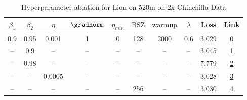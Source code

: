 \begin{table}[H]
\centering
\caption{Hyperparameter ablation for Lion on 520m on 2x Chinchilla Data}
\label{tab:ablation_lion_520m_on_2x_chinchilla_data}
\begin{tabular}{cccccccccc}
\toprule
$\beta_1$ & $\beta_2$ & $\eta$ & $\gradnorm$ & $\eta_{min}$ & $\mathrm{BSZ}$ & $\mathrm{warmup}$ & $\lambda$ & Loss & Link \\
\midrule
0.9 & 0.95 & 0.001 & 1 & 0 & 128 & 2000 & 0.6 & 3.029 & \href{https://wandb.ai/stanford-mercury/optimizer-scaling/runs/sweep-520m-21B-lion30535dlr0.001-wd0.6-minlr0-warmup2000-b10.9-b-c72b9c}{0} \\
\midrule
-- & 0.9 & -- & -- & -- & -- & -- & -- & 3.045 & \href{https://wandb.ai/stanford-mercury/optimizer-scaling/runs/sweep-520m-21B-lion6d497blr0.001-wd0.6-minlr0-warmup2000-b10.9-b-deb100}{1} \\
-- & 0.98 & -- & -- & -- & -- & -- & -- & 7.779 & \href{https://wandb.ai/stanford-mercury/optimizer-scaling/runs/sweep-520m-21B-lion70e78flr0.001-wd0.6-minlr0-warmup2000-b10.9-b-bd75ef}{2} \\
-- & -- & 0.0005 & -- & -- & -- & -- & -- & 3.028 & \href{https://wandb.ai/stanford-mercury/optimizer-scaling/runs/sweep-520m-21B-lion9e353dlr0.0005-wd0.6-minlr0-warmup2000-b10.9--0e18f5}{3} \\
-- & -- & -- & -- & -- & 256 & -- & -- & 3.030 & \href{https://wandb.ai/stanford-mercury/optimizer-scaling/runs/sweep-520m-21B-lion4bc061lr0.001-wd0.6-minlr0-warmup2000-b10.9-b-979e97}{4} \\
\bottomrule
\end{tabular}
\end{table}

